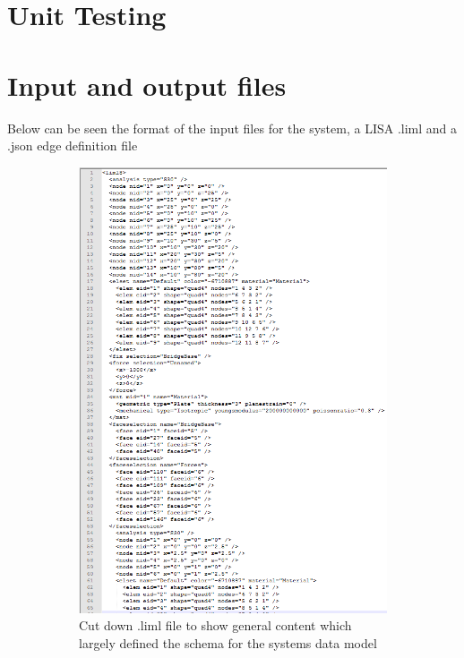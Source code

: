 \section{Unit Testing}



\cite{Centripetal}

\section{Input and output files}
Below can be seen the format of the input files for the system, a LISA .liml and a .json edge definition file\\

\begin{figure}[!h]
\centering
\begin{subfigure}{.5\textwidth}
  \centering
  \includegraphics[width=0.6\linewidth]{../Graphics/limlFileLayout.png}
  \caption{Cut down .liml file to show general content which largely defined the schema for the systems data model}
  \label{fig:sub1}
\end{subfigure}%
\begin{subfigure}{.5\textwidth}
  \centering

\end{subfigure}
\end{figure}
